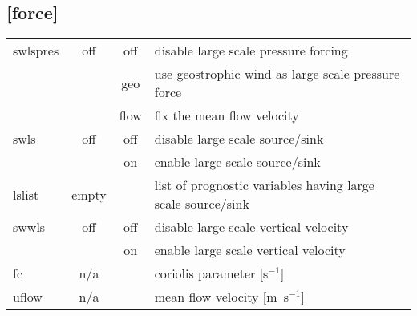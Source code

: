 \documentclass[a4paper,10pt]{extarticle}
\begin{document}
\subsection*{[force]}
\tablelasttail{\hline}
\begin{supertabular}{lccl}
swlspres      & off   & off  & disable large scale pressure forcing \\
              &       & geo  & use geostrophic wind as large scale pressure force \\
              &       & flow & fix the mean flow velocity \\
swls          & off   & off  & disable large scale source/sink \\
              &       & on   & enable large scale source/sink \\
lslist        & empty &      & list of prognostic variables having large scale source/sink \\
swwls         & off   & off  & disable large scale vertical velocity \\
              &       & on   & enable large scale vertical velocity \\
fc            & n/a   &      & coriolis parameter [s$^{-1}$] \\
uflow         & n/a   &      & mean flow velocity [m~s$^{-1}$] \\
\end{supertabular}
\end{document}
